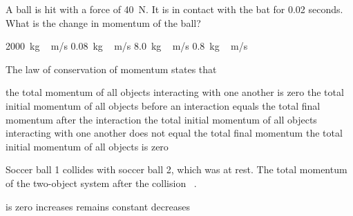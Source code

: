 \documentclass[../main-physics-problems.tex]{subfiles}
\begin{document}
\begin{questions}
\question
A ball is hit with a force of \SI{40}{N}. It is in contact with the bat for 0.02 seconds. What is the change in momentum of the ball?

\begin{randomizechoices}
\choice \SI{2000}{kg\,m/s}
\choice \SI{0.08}{kg\,m/s}
\choice \SI{8.0}{kg\,m/s}
\correctchoice \SI{0.8}{kg\,m/s}
\end{randomizechoices}





\question
The law of conservation of momentum states that

\begin{randomizechoices}
    \choice the total momentum of all objects interacting with one another is zero
    \correctchoice the total initial momentum of all objects before an interaction equals the total final momentum after the interaction
    \choice the total initial momentum of all objects interacting with one another does not equal the total final momentum  
    \choice the total initial momentum of all objects is zero 
\end{randomizechoices}

\clearpage
\question
Soccer ball 1 collides with soccer ball 2, which was at rest. The total momentum of the two-object system after the collision \fillin\ .

\begin{randomizechoices}
    \choice is zero
    \choice increases
    \correctchoice remains constant
    \choice decreases
\end{randomizechoices}


\end{questions}
\end{document}
